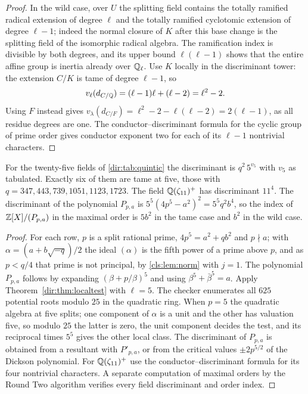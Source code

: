 \begin{proof}
In the wild case, over $U$ the splitting field contains the totally ramified radical
extension of degree $\ell$ and the totally ramified cyclotomic extension of degree
$\ell-1$; indeed the normal closure of $K$ after this base change is the splitting
field of the isomorphic radical algebra. The ramification index is divisible by both
degrees, and its upper bound $\ell(\ell-1)$ shows that the entire affine group is
inertia already over $\mathbb{Q}_\ell$. Use $K$ locally in the discriminant tower: the
extension $C/K$ is tame of degree $\ell-1$, so
\[
 v_\ell(d_{C/\mathbb{Q}})=(\ell-1)\ell+(\ell-2)=\ell^2-2 .
\]
Using $F$ instead gives $v_\lambda(d_{C/F})=\ell^2-2-\ell(\ell-2)=2(\ell-1)$, as all
residue degrees are one. The conductor--discriminant formula for the cyclic group of
prime order gives conductor exponent two for each of its $\ell-1$ nontrivial
characters.
\end{proof}

\begin{corollary}\label{dir:cor:quinticdisc}
For the twenty-five fields of \cref{dir:tab:quintic} the discriminant is
$q^2\,5^{v_5}$ with $v_5$ as tabulated. Exactly six of them are tame at five, those
with $q=347,443,739,1051,1123,1723$. The field $\mathbb{Q}(\zeta_{11})^+$ has discriminant
$11^4$. The discriminant of the polynomial $P_{p,a}$ is $5^5(4p^5-a^2)^2=5^5q^2b^4$,
so the index of $\mathbb{Z}[X]/(P_{p,a})$ in the maximal order is $5b^2$ in the tame case and
$b^2$ in the wild case.
\end{corollary}

\begin{proof}
For each row, $p$ is a split rational prime, $4p^5=a^2+qb^2$ and $p\nmid a$; with
$\alpha=(a+b\sqrt{-q})/2$ the ideal $(\alpha)$ is the fifth power of a prime above $p$,
and as $p<q/4$ that prime is not principal, by \cref{cls:lem:norm} with $j=1$. The polynomial $P_{p,a}$ follows
by expanding $(\beta+p/\beta)^5$ and using $\beta^5+\bar\beta^5=a$. Apply
Theorem~\ref{dir:thm:localtest} with $\ell=5$. The checker enumerates all $625$ potential
roots modulo $25$ in the quadratic ring. When $p=5$ the quadratic algebra at
five splits; one component of $\alpha$ is a unit and the other has valuation five, so
modulo $25$ the latter is zero, the unit component decides the test, and its
reciprocal times $5^5$ gives the other local class. The discriminant of $P_{p,a}$ is
obtained from a resultant with $P'_{p,a}$, or from the critical values $\pm2p^{5/2}$
of the Dickson polynomial. For $\mathbb{Q}(\zeta_{11})^+$ use the conductor--discriminant
formula for its four nontrivial characters. A separate computation of maximal orders
by the Round Two algorithm verifies every field discriminant and order index.
\end{proof}

